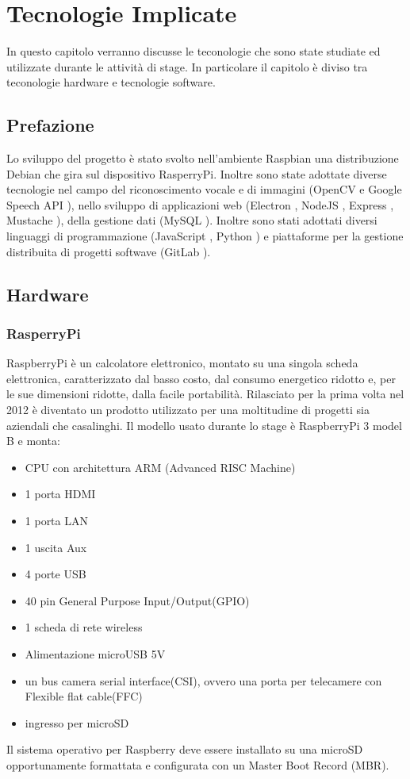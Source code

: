 \chapter{Tecnologie Implicate}\label{capitolo2}
In questo capitolo verranno discusse le teconologie che sono state studiate ed utilizzate durante le attività di stage.
In particolare il capitolo è diviso tra teconologie hardware e tecnologie software.

\section{Prefazione}
Lo sviluppo del progetto \`e stato svolto nell'ambiente Raspbian\cite{Raspbian}
una distribuzione Debian\cite{Debian} che gira sul dispositivo RasperryPi\cite{Raspberry}.
Inoltre sono state adottate diverse tecnologie nel campo del riconoscimento vocale e di
immagini (OpenCV \cite{OpenCV-website} e Google Speech API \cite{GoogleSTT-website}),
nello sviluppo di applicazioni web (Electron \cite{Electron-website}, NodeJS \cite{NodeJS-website},
Express \cite{Express-website}, Mustache \cite{Mustache}), della gestione dati (MySQL \cite{MySQL}).
Inoltre sono stati adottati diversi linguaggi di programmazione (JavaScript \cite{JavaScript}, Python \cite{Python})
e piattaforme per la gestione distribuita di progetti softwave (GitLab \cite{git-website}).

\section{Hardware}
\subsection{RasperryPi}
RaspberryPi \`e un calcolatore elettronico, montato su una singola scheda elettronica,
caratterizzato dal basso costo, dal consumo energetico ridotto e, per le sue
dimensioni ridotte, dalla facile portabilit\`a.
Rilasciato per la prima volta nel 2012 \`e diventato un prodotto utilizzato per una moltitudine
di progetti sia aziendali che casalinghi.
Il modello usato durante lo stage \`e RaspberryPi 3 model B e monta:
\begin{itemize}
\item CPU con architettura ARM (Advanced RISC Machine)
\item 1 porta HDMI
\item 1 porta LAN
\item 1 uscita Aux
\item 4 porte USB
\item 40 pin General Purpose Input/Output(GPIO)
\item 1 scheda di rete wireless
\item Alimentazione microUSB 5V
\item un bus camera serial interface(CSI), ovvero una porta per telecamere con Flexible flat cable(FFC)
\item ingresso per microSD
\end{itemize}
Il sistema operativo per Raspberry deve essere installato su una microSD opportunamente formattata
e configurata con un Master Boot Record (MBR).


